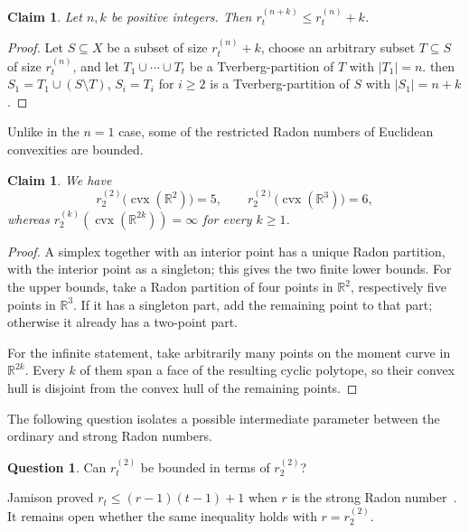\documentclass[11pt]{article}
\newtheorem{claim}[thm]{Claim}
\theoremstyle{definition}
\newtheorem{question}[thm]{Question}
\newcommand{\cvx}{\operatorname{cvx}}
\renewcommand{\Re}{\mathbb{R}}
\begin{document}
\begin{claim}\label{cl:extendedTverbergPartition}
    Let $n,k$ be positive integers. Then $r^{(n+k)}_t \leq r^{(n)}_t+k$.
\end{claim}

\begin{proof}
    Let $S \subseteq X$ be a subset of size $r^{(n)}_t+k$, choose an arbitrary subset $T \subseteq S$ of size $r^{(n)}_t$, and let $T_1 \cup \cdots \cup T_t$ be a Tverberg-partition of $T$ with $|T_1| = n$. then $S_1 = T_1 \cup (S \setminus T)$, $S_i = T_i$ for $i \geq 2$ is a Tverberg-partition of $S$ with $|S_1| = n+k$.
\end{proof}

Unlike in the $n=1$ case, some of the restricted Radon numbers of Euclidean convexities are bounded.

\begin{claim}\label{ex:PairedRadon}
We have
\[
r^{(2)}_2\bigl(\cvx(\Re^2)\bigr)=5,
\qquad
r^{(2)}_2\bigl(\cvx(\Re^3)\bigr)=6,
\]
whereas $r^{(k)}_2(\cvx(\Re^{2k}))=\infty$ for every $k\ge1$.
\end{claim}

\begin{proof}
A simplex together with an interior point has a unique Radon partition, with the interior point as a singleton; this gives the two finite lower bounds. For the upper bounds, take a Radon partition of four points in $\Re^2$, respectively five points in $\Re^3$. If it has a singleton part, add the remaining point to that part; otherwise it already has a two-point part.

For the infinite statement, take arbitrarily many points on the moment curve in $\Re^{2k}$. Every $k$ of them span a face of the resulting cyclic polytope, so their convex hull is disjoint from the convex hull of the remaining points.
\end{proof}

The following question isolates a possible intermediate parameter between the ordinary and strong Radon numbers.

\begin{question}
Can $r_t^{(2)}$ be bounded in terms of $r_2^{(2)}$?
\end{question}

Jamison proved $r_t\le(r-1)(t-1)+1$ when $r$ is the strong Radon number~\cite{jamison1981partition}. It remains open whether the same inequality holds with $r=r_2^{(2)}$.
\end{document}
